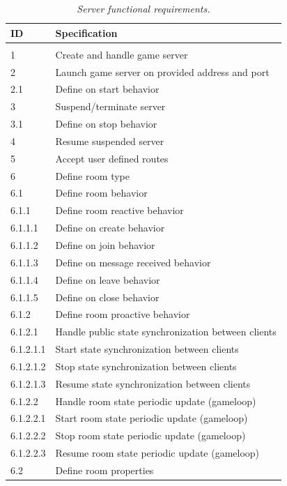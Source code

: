 \begin{center}
  \begin{longtable}{|l|l|} 
    \caption{\textit{Server functional requirements.}} \label{table:server-f-req} \\
  
\hline
ID   &  Specification \\
\hline
\multicolumn{2}{|c|}{} \\
\hline
1         & Create and handle game server \\
2         & Launch game server on provided address and port \\
2.1       & Define on start behavior \\
3         & Suspend/terminate server \\
3.1       & Define on stop behavior \\
4         & Resume suspended server \\
5         & Accept user defined routes \\
6         & Define room type \\
6.1       & Define room behavior \\
6.1.1     & Define room reactive behavior \\
6.1.1.1   & Define on create behavior \\
6.1.1.2   & Define on join behavior \\
6.1.1.3   & Define on message received behavior \\
6.1.1.4   & Define on leave behavior \\
6.1.1.5   & Define on close behavior \\
6.1.2     & Define room proactive behavior \\
6.1.2.1   & Handle public state synchronization between clients \\
6.1.2.1.1 & Start state synchronization between clients \\
6.1.2.1.2 & Stop state synchronization between clients \\
6.1.2.1.3 & Resume state synchronization between clients \\
6.1.2.2   & Handle room state periodic update (gameloop)  \\ 
6.1.2.2.1 & Start room state periodic update (gameloop) \\
6.1.2.2.2 & Stop room state periodic update (gameloop) \\
6.1.2.2.3 & Resume room state periodic update (gameloop) \\
6.2       & Define room properties\\

\end{longtable}
\end{center}
